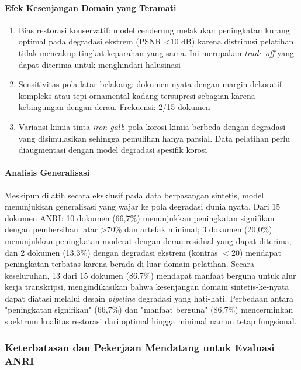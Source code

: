 \documentclass[journal]{IEEEtran}
\begin{document}
\paragraph{Efek Kesenjangan Domain yang Teramati}
\begin{enumerate}
    \item Bias restorasi konservatif: model cenderung melakukan peningkatan kurang optimal pada degradasi ekstrem (PSNR <10 dB) karena distribusi pelatihan tidak mencakup tingkat keparahan yang sama. Ini merupakan \textit{trade-off} yang dapat diterima untuk menghindari halusinasi
    
    \item Sensitivitas pola latar belakang: dokumen nyata dengan margin dekoratif kompleks atau tepi ornamental kadang tersupresi sebagian karena kebingungan dengan derau. Frekuensi: 2/15 dokumen
    
    \item Variansi kimia tinta \textit{iron gall}: pola korosi kimia berbeda dengan degradasi yang disimulasikan sehingga pemulihan hanya parsial. Data pelatihan perlu diaugmentasi dengan model degradasi spesifik korosi
\end{enumerate}

\paragraph{Analisis Generalisasi}
Meskipun dilatih secara eksklusif pada data berpasangan sintetis, model menunjukkan generalisasi yang wajar ke pola degradasi dunia nyata. Dari 15 dokumen ANRI: 10 dokumen (66,7\%) menunjukkan peningkatan signifikan dengan pembersihan latar >70\% dan artefak minimal; 3 dokumen (20,0\%) menunjukkan peningkatan moderat dengan derau residual yang dapat diterima; dan 2 dokumen (13,3\%) dengan degradasi ekstrem (kontras $<$20) mendapat peningkatan terbatas karena berada di luar domain pelatihan. Secara keseluruhan, 13 dari 15 dokumen (86,7\%) mendapat manfaat berguna untuk alur kerja transkripsi, mengindikasikan bahwa kesenjangan domain sintetis-ke-nyata dapat diatasi melalui desain \textit{pipeline} degradasi yang hati-hati. Perbedaan antara "peningkatan signifikan" (66,7\%) dan "manfaat berguna" (86,7\%) mencerminkan spektrum kualitas restorasi dari optimal hingga minimal namun tetap fungsional.

\subsubsection{Keterbatasan dan Pekerjaan Mendatang untuk Evaluasi ANRI}
\end{document}
